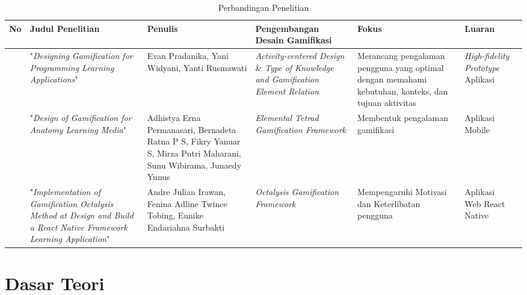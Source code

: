 \begin{landscape}
	\begin{table}[htbp]
	\caption{Perbandingan Penelitian}
	\centering
	\begin{tabular}{|>{\centering\arraybackslash}m{0.5cm}|m{4cm}|m{3.5cm}|m{4.5cm}|m{4.5cm}|m{4cm}|m{4cm}|}
		\hline
		\centering \textbf{No} & \centering \textbf{Judul Penelitian} & \centering \textbf{Penulis} & \centering  \textbf{Pengembangan Desain Gamifikasi} &\centering\textbf{Fokus}&\multicolumn{1}{m{4cm}|}{\centering\textbf{Luaran}} \\
		\hline 
		1 & "\textit{Designing Gamification for Programming Learning Applications}"
		& 
		Evan Pradanika, Yani Widyani,  Yanti Rusmawati
		& \textit{Activity-centered Design} \& \textit{Type of Knowledge and Gamification Element Relation}& Merancang pengalaman pengguna yang optimal dengan memahami kebutuhan, konteks, dan tujuan aktivitas& \textit{High-fidelity Prototype} Aplikasi\\
		\hline
		2 &"\textit{Design of Gamification for Anatomy Learning Media}" 
		& 
		Adhistya Erna Permanasari, Bernadeta Ratna P S, Fikry Yanuar S, Mirza Putri Maharani, Sunu Wibirama, Junaedy Yunus
		& \textit{Elemental Tetrad Gamification Framework} & Membentuk pengalaman gamifikasi & Aplikasi Mobile\\
		\hline
		3 & 
		"\textit{Implementation of Gamification Octalysis Method at Design and Build a React Native Framework Learning Application}" 
		& 
		Andre Julian Irawan, Fenina Adline Twince Tobing, Eunike Endariahna Surbakti
		& \textit{Octalysis Gamification Framework}& Mempengaruhi Motivasi dan Keterlibatan pengguna & Aplikasi Web React Native\\
		\hline
	  \end{tabular}
	  \label{Tab: Tabel perbandingan metode}
	\end{table}
\end{landscape}

\newpage
\section{Dasar Teori}
